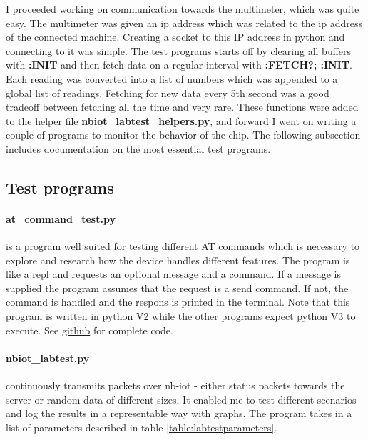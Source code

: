 \documentclass[USenglish]{ifimaster}  %
\begin{document}
I proceeded working on communication towards the multimeter, which was quite easy. The multimeter was given an \acrshort{ip} address which was related to the \acrshort{ip} address of the connected machine. Creating a socket to this IP address in python and connecting to it was simple. The test programs starts off by clearing all buffers with \textbf{:INIT} and then fetch data on a regular interval with \textbf{:FETCH?; :INIT}. Each reading was converted into a list of numbers which was appended to a global list of readings. Fetching for new data every 5th second was a good tradeoff between fetching all the time and very rare. These functions were added to the helper file \textbf{nbiot\_labtest\_helpers.py}, and forward I went on writing a couple of programs to monitor the behavior of the chip. The following subsection includes documentation on the most essential test programs.

\subsection{Test programs}
\paragraph{\textbf{at\_command\_test.py}} is a program well suited for testing different AT commands which is necessary to explore and research how the device handles different features. The program is like a \acrshort{repl} and requests an optional message and a command. If a message is supplied the program assumes that the request is a send command. If not, the command is handled and the respons is printed in the terminal. Note that this program is written in python V2 while the other programs expect python V3 to execute. See \href{https://github.com/henninghaakonsen/thesis/blob/master/code/at_command_test.py}{github}\cite{code:atcommand} for complete code.

\paragraph{\textbf{nbiot\_labtest.py}} continuously transmits packets over \acrshort{nb-iot} - either status packets towards the server or random data of different sizes. It enabled me to test different scenarios and log the results in a representable way with graphs. The program takes in a list of parameters described in table \vref{table:labtestparameters}.
\end{document}
